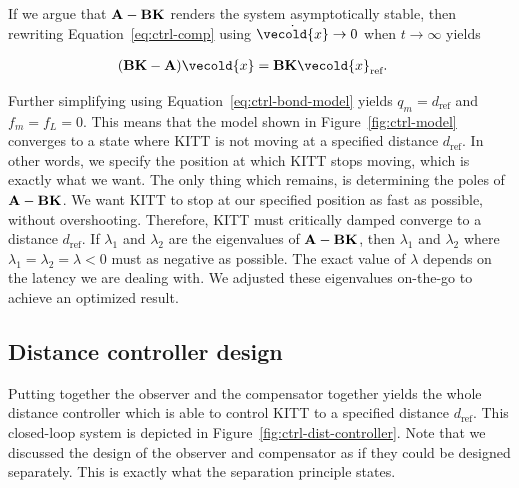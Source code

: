 \documentclass[11pt,titlepage]{report}
\let\vec\vecold
\newcommand{\vec}[1]{\mathbf{#1}}
\begin{document}
If we argue that $\mathbf{A} - \mathbf{B} \mathbf{K}$ renders the system asymptotically stable, then rewriting Equation~\ref{eq:ctrl-comp} using $\dot{\vec{x}} \to 0$ when $t \to \infty$ yields

\begin{align*}
	(\mat{B} \mat{K} - \mat{A}) \vec{x} &= \mat{B} \mat{K} \vec{x}_{\text{ref}}.
\end{align*}

Further simplifying using Equation~\ref{eq:ctrl-bond-model} yields $q_m = d_{\text{ref}}$ and $f_m = f_L = 0$. This means that the model shown in Figure~\ref{fig:ctrl-model} converges to a state where KITT is not moving at a specified distance $d_{\text{ref}}$. In other words, we specify the position at which KITT stops moving, which is exactly what we want. The only thing which remains, is determining the poles of $\mathbf{A} - \mathbf{B} \mathbf{K}$. We want KITT to stop at our specified position as fast as possible, without overshooting. Therefore, KITT must critically damped converge to a distance $d_{\text{ref}}$. If $\lambda_1$ and $\lambda_2$ are the eigenvalues of $\mathbf{A} - \mathbf{B} \mathbf{K}$, then $\lambda_1$ and $\lambda_2$ where $\lambda_1 = \lambda_2 = \lambda < 0$ must as negative as possible. The exact value of $\lambda$ depends on the latency we are dealing with. We adjusted these eigenvalues on-the-go to achieve an optimized result.

\subsection{Distance controller design}
Putting together the observer and the compensator together yields the whole distance controller which is able to control KITT to a specified distance $d_{\text{ref}}$. This closed-loop system is depicted in Figure~\ref{fig:ctrl-dist-controller}. Note that we discussed the design of the observer and compensator as if they could be designed separately. This is exactly what the separation principle states. 
\end{document}
